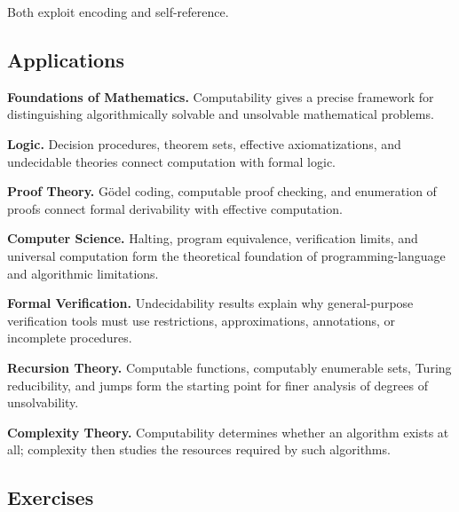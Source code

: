 Both exploit encoding and self-reference.

\subsection{Applications}
\label{subsec:computability-applications}

\begin{applicationbox}

\textbf{Foundations of Mathematics.}
Computability gives a precise framework for distinguishing algorithmically
solvable and unsolvable mathematical problems.

\medskip

\textbf{Logic.}
Decision procedures, theorem sets, effective axiomatizations, and
undecidable theories connect computation with formal logic.

\medskip

\textbf{Proof Theory.}
Gödel coding, computable proof checking, and enumeration of proofs connect
formal derivability with effective computation.

\medskip

\textbf{Computer Science.}
Halting, program equivalence, verification limits, and universal
computation form the theoretical foundation of programming-language and
algorithmic limitations.

\medskip

\textbf{Formal Verification.}
Undecidability results explain why general-purpose verification tools must
use restrictions, approximations, annotations, or incomplete procedures.

\medskip

\textbf{Recursion Theory.}
Computable functions, computably enumerable sets, Turing reducibility, and
jumps form the starting point for finer analysis of degrees of
unsolvability.

\medskip

\textbf{Complexity Theory.}
Computability determines whether an algorithm exists at all; complexity
then studies the resources required by such algorithms.

\end{applicationbox}

\subsection{Exercises}
\label{subsec:computability-exercises}

